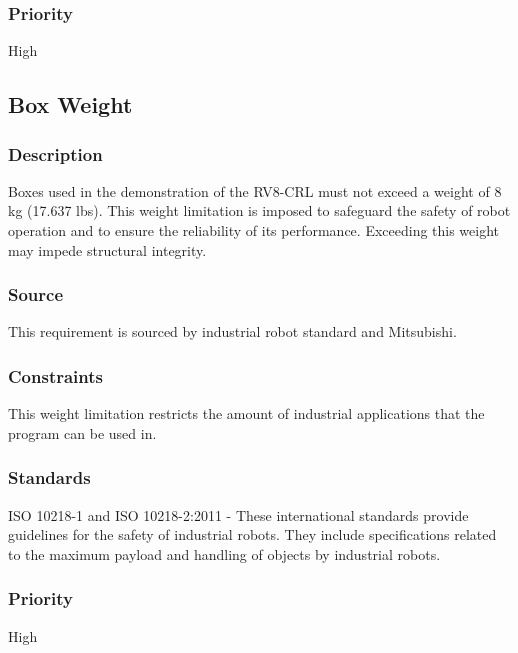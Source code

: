 \subsubsection{Priority}
High

\subsection{Box Weight}
\subsubsection{Description}
Boxes used in the demonstration of the RV8-CRL must not exceed a weight of 8 kg (17.637 lbs). This weight limitation is imposed to safeguard the safety of robot operation and to ensure the reliability of its performance. Exceeding this weight may impede structural integrity.
\subsubsection{Source}
This requirement is sourced by industrial robot standard and Mitsubishi.
\subsubsection{Constraints}
This weight limitation restricts the amount of industrial applications that the program can be used in.
\subsubsection{Standards}
ISO 10218-1 and ISO 10218-2:2011 - These international standards provide guidelines for the safety of industrial robots. They include specifications related to the maximum payload and handling of objects by industrial robots.
\subsubsection{Priority}
High
